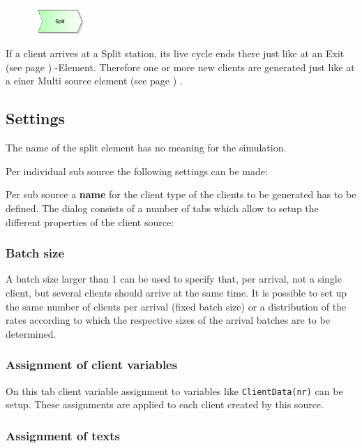 \begin{figure}
\vspace{-22pt}
\includegraphics[width=2cm]{imageModelElementSplit.png}
\vspace{-22pt}
\end{figure}

If a client arrives at a Split station, its live cycle ends there just like
at an  Exit (see page \pageref{ref:ModelElementDispose}) -Element.
Therefore one or more new clients are generated just like at a
einer Multi source element (see page \pageref{ref:ModelElementSourceMulti}) .

\subsection*{Settings}

The name of the split element has no meaning for the simulation.

Per individual sub source the following settings can be made:

Per sub source a \textbf{name} for the client type of the clients to be generated has to be defined.
The dialog consists of a number of tabs which allow to setup the different properties of the client source:

\subsubsection*{Batch size}

A batch size larger than 1 can be used to specify that, per arrival, not a single client,
but several clients should arrive at the same time. It is possible to set up the same number
of clients per arrival (fixed batch size) or a distribution of the rates according to which
the respective sizes of the arrival batches are to be determined.

\subsubsection*{Assignment of client variables}

On this tab client variable assignment to variables like \texttt{ClientData(nr)} can be setup.
These assignments are applied to each client created by this source.

\subsubsection*{Assignment of texts}

